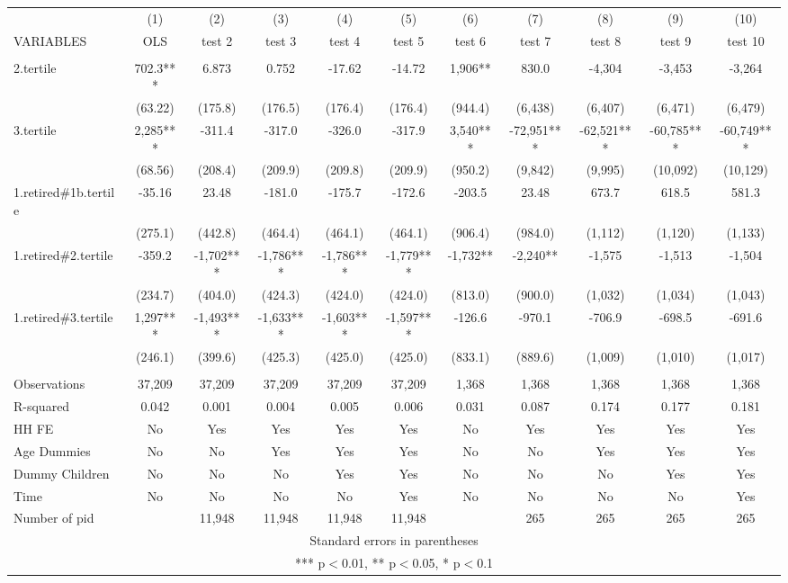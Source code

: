 \begin{tabular}{lcccccccccc} \hline
 & (1) & (2) & (3) & (4) & (5) & (6) & (7) & (8) & (9) & (10) \\
VARIABLES & OLS & test 2 & test 3 & test 4 & test 5 & test 6 & test 7 & test 8 & test 9 & test 10 \\ \hline
 &  &  &  &  &  &  &  &  &  &  \\
2.tertile & 702.3*** & 6.873 & 0.752 & -17.62 & -14.72 & 1,906** & 830.0 & -4,304 & -3,453 & -3,264 \\
 & (63.22) & (175.8) & (176.5) & (176.4) & (176.4) & (944.4) & (6,438) & (6,407) & (6,471) & (6,479) \\
3.tertile & 2,285*** & -311.4 & -317.0 & -326.0 & -317.9 & 3,540*** & -72,951*** & -62,521*** & -60,785*** & -60,749*** \\
 & (68.56) & (208.4) & (209.9) & (209.8) & (209.9) & (950.2) & (9,842) & (9,995) & (10,092) & (10,129) \\
1.retired\#1b.tertile & -35.16 & 23.48 & -181.0 & -175.7 & -172.6 & -203.5 & 23.48 & 673.7 & 618.5 & 581.3 \\
 & (275.1) & (442.8) & (464.4) & (464.1) & (464.1) & (906.4) & (984.0) & (1,112) & (1,120) & (1,133) \\
1.retired\#2.tertile & -359.2 & -1,702*** & -1,786*** & -1,786*** & -1,779*** & -1,732** & -2,240** & -1,575 & -1,513 & -1,504 \\
 & (234.7) & (404.0) & (424.3) & (424.0) & (424.0) & (813.0) & (900.0) & (1,032) & (1,034) & (1,043) \\
1.retired\#3.tertile & 1,297*** & -1,493*** & -1,633*** & -1,603*** & -1,597*** & -126.6 & -970.1 & -706.9 & -698.5 & -691.6 \\
 & (246.1) & (399.6) & (425.3) & (425.0) & (425.0) & (833.1) & (889.6) & (1,009) & (1,010) & (1,017) \\
 &  &  &  &  &  &  &  &  &  &  \\
Observations & 37,209 & 37,209 & 37,209 & 37,209 & 37,209 & 1,368 & 1,368 & 1,368 & 1,368 & 1,368 \\
R-squared & 0.042 & 0.001 & 0.004 & 0.005 & 0.006 & 0.031 & 0.087 & 0.174 & 0.177 & 0.181 \\
HH FE & No & Yes & Yes & Yes & Yes & No & Yes & Yes & Yes & Yes \\
Age Dummies & No & No & Yes & Yes & Yes & No & No & Yes & Yes & Yes \\
Dummy Children & No & No & No & Yes & Yes & No & No & No & Yes & Yes \\
Time & No & No & No & No & Yes & No & No & No & No & Yes \\
 Number of pid &  & 11,948 & 11,948 & 11,948 & 11,948 &  & 265 & 265 & 265 & 265 \\ \hline
\multicolumn{11}{c}{ Standard errors in parentheses} \\
\multicolumn{11}{c}{ *** p$<$0.01, ** p$<$0.05, * p$<$0.1} \\
\end{tabular}
